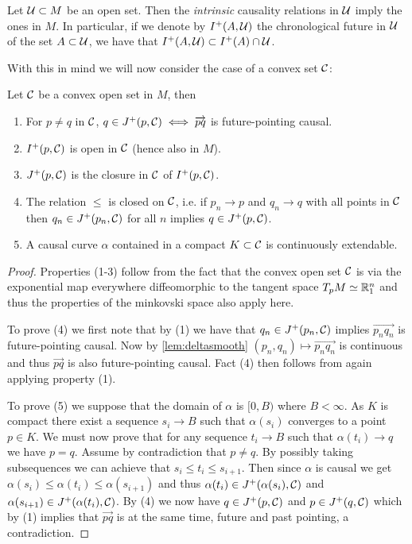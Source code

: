 Let $\mathcal{U} \subset M$ be an open set. Then the \emph{intrinsic} causality relations in $\mathcal{U}$ imply the ones in $M$. In particular, if we denote by $I^+(A,\mathcal{U})$ the chronological future in $\mathcal{U}$ of the set $A\subset\mathcal{U}$, we have that $I^+(A,\mathcal{U}) \subset I^+(A)\cap \mathcal{U}$.

With this in mind we will now consider the case of a convex set $\mathcal{C}$:
\begin{lemma}\label{lem:convtopo}
Let $\mathcal{C}$ be a convex open set in $M$, then
\begin{enumerate}[label={\textnormal{(\arabic*)}}]
    \item For $p\neq q$ in $\mathcal{C}$, $q\in J^+(p,\mathcal{C}) \iff \overrightarrow{pq}$ is future-pointing causal.
    \item $I^+(p,\mathcal{C})$ is open in $\mathcal{C}$ (hence also in $M$).
    \item $J^+(p,\mathcal{C})$ is the closure in $\mathcal{C}$ of $I^+(p,\mathcal{C})$.
    \item The relation $\leq$ is closed on $\mathcal{C}$, i.e. if $p_n \to p$ and $q_n \to q$ with all points in $\mathcal{C}$ then $q_n\in J^+(p_n,\mathcal{C})$ for all $n$ implies $q\in J^+(p,\mathcal{C})$.
    \item A causal curve $\alpha$ contained in a compact $K\subset\mathcal{C}$ is continuously extendable. 
\end{enumerate}
\end{lemma}
\begin{proof}
Properties (1-3) follow from the fact that the convex open set $\mathcal{C}$ is via the exponential map everywhere diffeomorphic to the tangent space $T_pM\simeq \mathbb{R}^n_1$ and thus the properties of the minkovski space also apply here.

To prove (4) we first note that by (1) we have that $q_n\in J^+(p_n,\mathcal{C})$ implies $\overrightarrow{p_nq_n}$ is future-pointing causal. Now by \ref{lem:deltasmooth} $(p_n,q_n)\mapsto\overrightarrow{p_nq_n}$ is continuous and thus $\overrightarrow{pq}$ is also future-pointing causal. Fact (4) then follows from again applying property (1). 

To prove (5) we suppose that the domain of $\alpha$ is $[0,B)$ where $B<\infty$. As $K$ is compact there exist a sequence $s_i\to B$ such that $\alpha(s_i)$ converges to a point $p\in K$. We must now prove that for any sequence $t_i\to B$ such that $\alpha(t_i)\to q$ we have $p=q$. Assume by contradiction that $p\neq q$. By possibly taking subsequences we can achieve that $s_i \le t_i \le s_{i+1}$.
Then since $\alpha$ is causal we get  $\alpha(s_i)\le \alpha(t_i) \le \alpha(s_{i+1})$ and thus $\alpha(t_i) \in J^+(\alpha(s_i),\mathcal{C})$ and $\alpha(s_{i+1}) \in J^+(\alpha(t_i),\mathcal{C})$. By (4) we now have $q\in J^+(p,\mathcal{C})$ and $p\in J^+(q,\mathcal{C})$ which by (1) implies that $\overrightarrow{pq}$ is at the same time, future and past pointing, a contradiction.
\end{proof}


